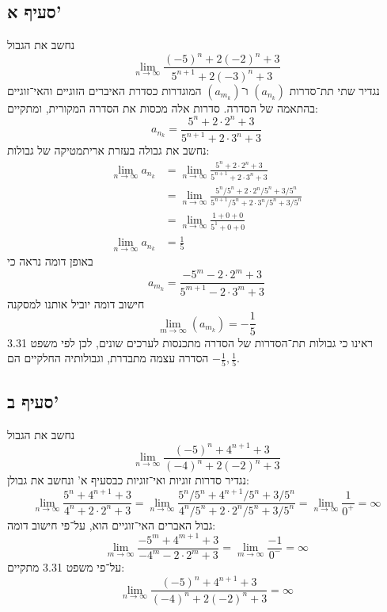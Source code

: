\subsection{סעיף א'}
נחשב את הגבול
\[
	\lim_{n \to \infty}
	\frac{{(-5)}^n + 2{(-2)}^n + 3}{5^{n + 1} + 2{(-3)}^n + 3}
\]
נגדיר שתי תת־סדרות $(a_{n_k})$ ו־$(a_{m_k})$
המוגדרות כסדרת האיברים הזוגיים והאי־זוגיים בהתאמה של הסדרה.
סדרות אלה מכסות את הסדרה המקורית, ומתקיים:
\[
	a_{n_k} = \frac{{5}^n + 2 \cdot 2^n + 3}{5^{n + 1} + 2 \cdot 3^n + 3}
\]
נחשב את גבולה בעזרת אריתמטיקה של גבולות:
\begin{align*}
	\lim_{n \to \infty} a_{n_k}
	& = \lim_{n \to \infty} \frac{{5}^n + 2 \cdot 2^n + 3}{5^{n + 1} + 2 \cdot 3^n + 3} \\
	& = \lim_{n \to \infty} \frac{{5}^n/5^n + 2 \cdot 2^n / 5^n + 3/5^n}{5^{n + 1}/5^n + 2 \cdot 3^n/5^n + 3/5^n} \\
	& = \lim_{n \to \infty} \frac{1 + 0 + 0}{5^1 + 0 + 0} \\
	\lim_{n \to \infty} a_{n_k} & = \frac{1}{5}
\end{align*}
באופן דומה נראה כי
\[
	a_{m_k} = \frac{-{5}^m - 2 \cdot 2^m + 3}{5^{m + 1} - 2 \cdot 3^m + 3}
\]
חישוב דומה יוביל אותנו למסקנה
\[
	\lim_{m \to \infty} (a_{m_k}) = -\frac{1}{5}
\]
ראינו כי גבולות תת־הסדרות של הסדרה מתכנסות לערכים שונים,
לכן לפי משפט 3.31 הסדרה עצמה מתבדרת,
וגבולותיה החלקיים הם $-\frac{1}{5}, \frac{1}{5}$.

\subsection{סעיף ב'}
נחשב את הגבול
\[
	\lim_{n \to \infty} \frac{{(-5)}^n + 4^{n + 1} + 3}{({-4})^n + 2{(-2)}^n + 3}
\]
נגדיר סדרות זוגיות ואי־זוגיות כבסעיף א' ונחשב את גבולן:
\[
	\lim_{n \to \infty} \frac{5^n + 4^{n + 1} + 3}{4^n + 2 \cdot 2^n + 3}
	= \lim_{n \to \infty} \frac{5^n/5^n + 4^{n + 1}/5^n + 3/5^n}{4^n/5^n + 2 \cdot 2^n/5^n + 3/5^n}
	= \lim_{n \to \infty} \frac{1}{0^+}
	= \infty
\]
גבול האברים האי־זוגיים הוא, על־פי חישוב דומה:
\[
	\lim_{m \to \infty} \frac{-5^m + 4^{m + 1} + 3}{-4^m - 2 \cdot 2^m + 3}
	= \lim_{m \to \infty} \frac{-1}{0^-}
	= \infty
\]
על־פי משפט 3.31 מתקיים:
\[
	\lim_{n \to \infty} \frac{{(-5)}^n + 4^{n + 1} + 3}{({-4})^n + 2{(-2)}^n + 3} = \infty
\]

